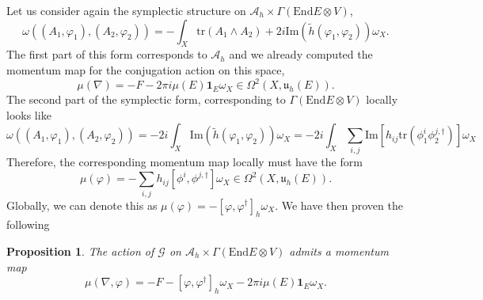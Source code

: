 \documentclass[12pt,a4paper]{book}
\newtheorem{prop}[thm]{Proposition}
\theoremstyle{definition} \newtheorem{defn}[thm]{Definition}
\theoremstyle{definition} \newtheorem{ejemplo}[thm]{Example}
\theoremstyle{remark} \newtheorem{rem}[thm]{Remark}
\def\AA{\mathscr{A}}
\def\GG{\mathscr{G}}
\def\tr{\mathrm{tr}}
\def\id{\mathbf{1}}
\def\End{\mathrm{End}}
\def\uu{\mathfrak{u}}
\begin{document}
    Let us consider again the symplectic structure on $\AA_h\times \Gamma(\End E \otimes V)$,
    \begin{equation*}
      \omega\left( (A_1,\varphi_1),(A_2,\varphi_2) \right)=-\int_X \tr(A_1 \wedge A_2) + 2i \mathrm{Im}(\tilde{h}(\varphi_1, \varphi_2)) \omega_X.
    \end{equation*}
    The first part of this form corresponds to $\AA_h$ and we already computed the momentum map for the conjugation action on this space,
    \begin{equation*}
      \mu(\nabla)=-F-2\pi i \mu(E)\id_E \omega_X \in \Omega^2(X,\uu_h(E)).
    \end{equation*}
    The second part of the symplectic form, corresponding to $\Gamma(\End E \otimes V)$ locally looks like
    \begin{equation*}
      \omega\left( (A_1,\varphi_1),(A_2,\varphi_2) \right)=- 2i\int_X  \mathrm{Im}(\tilde{h}(\varphi_1, \varphi_2)) \omega_X=-2i\int_X \sum_{i,j}\mathrm{Im}[h_{ij} \tr(\phi_1^i\phi_2^{j,\dagger})] \omega_X
    \end{equation*}
    Therefore, the corresponding momentum map locally must have the form
    \begin{equation*}
      \mu(\varphi)=-\sum_{i,j} h_{ij}[\phi^i,\phi^{j,\dagger}]\omega_X \in \Omega^2(X,\uu_h(E)).
    \end{equation*}
    Globally, we can denote this as $\mu(\varphi)=-[\varphi,\varphi^{\dagger}]_h\omega_X$. We have then proven the following
    \begin{prop}
     The action of $\GG$ on $\AA_h \times \Gamma(\End E \otimes V)$ admits a momentum map
     \begin{equation*}
       \mu(\nabla,\varphi)=-F-\left[ \varphi,\varphi^\dagger \right]_h \omega_X -2\pi i \mu(E) \id_E \omega_X.
     \end{equation*}
    \end{prop}
\end{document}
